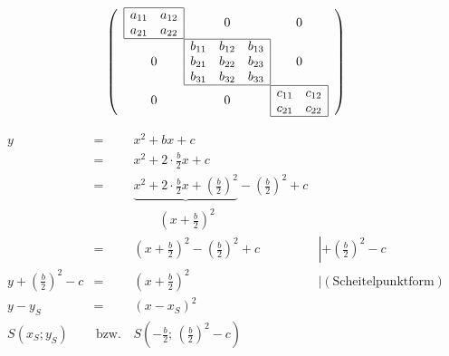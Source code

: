 \documentclass[dvips,a4paper,english]{article}
\begin{document}
\begin{LTXexample}[pos=l]
\begin{dogrid}[][Gtrim=-1 0,linecolor=red!70]
\[ \left(
\begin{array}{c@{}c@{}c}
\begin{array}{|cc|}\hline
a_{11} & a_{12} \\
a_{21} & a_{22} \\\hline
\end{array} & 0 & 0 \\
0 & \begin{array}{|ccc|}\hline
    b_{11} & b_{12} & b_{13}\\
    b_{21} & b_{22} & b_{23}\\
    b_{31} & b_{32} & b_{33}\\\hline
    \end{array} & 0 \\
0 & 0 & \begin{array}{|cc|}\hline
        c_{11} & c_{12} \\
        c_{21} & c_{22} \\\hline
        \end{array} \\
\end{array}\right)\]
\end{dogrid}
\end{LTXexample}


\begin{LTXexample}[pos=t]
\begin{dogrid}[][linestyle=solid,linecolor=black!20]
\[\begin{array}{rcll}
y & = & x^{2}+bx+c\\
  & = & x^{2}+2\cdot{\displaystyle\frac{b}{2}x+c}\\
  & = & \underbrace{x^{2}+2\cdot\frac{b}{2}x+\left(\frac{b}{2}\right)^{2}}-
	{\displaystyle \left(\frac{b}{2}\right)^{2}+c}\\
 &  & \qquad\left(x+{\displaystyle \frac{b}{2}}\right)^{2}\\
 & = & \left(x+{\displaystyle \frac{b}{2}}\right)^{2}-
	\left({\displaystyle \frac{b}{2}}\right)^{2}+c & 
	\left|+\left({\displaystyle \frac{b}{2}}\right)^{2}-c\right.\\
y+\left({\displaystyle \frac{b}{2}}\right)^{2}-c & = & \left(x+
	{\displaystyle \frac{b}{2}}\right)^{2} & \left|(\textrm{Scheitelpunktform})\right.\\
y-y_{S} & = & (x-x_{S})^{2}\\
S(x_{S};y_{S}) & \,\textrm{bzw.}\, & S\left(-{\displaystyle \frac{b}{2};\,
    \left({\displaystyle \frac{b}{2}}\right)^{2}-c}\right)
\end{array}\]
\end{dogrid}
\end{LTXexample}
\end{document}
